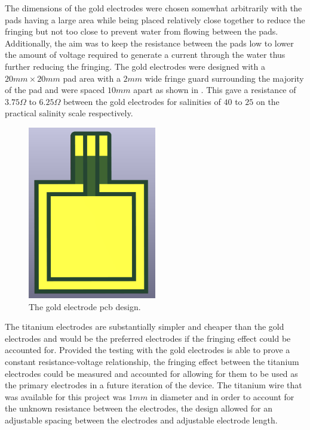 The dimensions of the gold electrodes were chosen somewhat arbitrarily with the pads having a large area while being placed relatively close together to reduce the fringing but not too close to prevent water from flowing between the pads.
Additionally, the aim was to keep the resistance between the pads low to lower the amount of voltage required to generate a current through the water thus further reducing the fringing. 
The gold electrodes were designed with a $20mm \times 20mm$ pad area with a $2mm$ wide fringe guard surrounding the majority of the pad and were spaced $10mm$ apart as shown in .
This gave a resistance of $3.75\Omega$ to $6.25\Omega$ between the gold electrodes for salinities of $40$ to $25$ on the practical salinity scale respectively.
\begin{figure}
    \centering
    \includegraphics[width=0.5\textwidth]{Figures/GoldElectrode}
    \caption{The gold electrode \gls{pcb} design.}
    \label{fig:gold-electrode} %
\end{figure}

The titanium electrodes are substantially simpler and cheaper than the gold electrodes and would be the preferred electrodes if the fringing effect could be accounted for.
Provided the testing with the gold electrodes is able to prove a constant resistance-voltage relationship, the fringing effect between the titanium electrodes could be measured and accounted for allowing for them to be used as the primary electrodes in a future iteration of the device.
The titanium wire that was available for this project was $1mm$ in diameter and in order to account for the unknown resistance between the electrodes, the design allowed for an adjustable spacing between the electrodes and adjustable electrode length.

